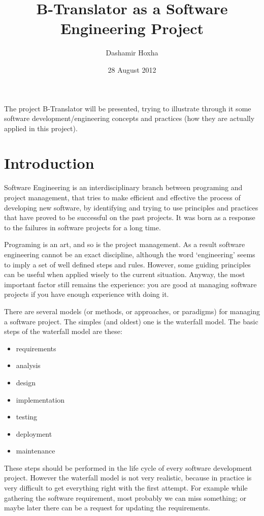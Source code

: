 \documentclass[11pt]{article}
\title{B-Translator as a Software Engineering Project}
\author{Dashamir Hoxha}
\date{28 August 2012}
\begin{document}
\maketitle

\setcounter{tocdepth}{3}
\tableofcontents
\vspace*{1cm}


  The project B-Translator will be presented, trying to illustrate
  through it some software development/engineering concepts and
  practices (how they are actually applied in this project).


\section{Introduction}
\label{sec-1}


  Software Engineering is an interdisciplinary branch between
  programing and project management, that tries to make efficient and
  effective the process of developing new software, by identifying and
  trying to use principles and practices that have proved to be
  successful on the past projects. It was born as a response to the
  failures in software projects for a long time.

  Programing is an art, and so is the project management. As a result
  software engineering cannot be an exact discipline, although the
  word `engineering' seems to imply a set of well defined steps and
  rules. However, some guiding principles can be useful when applied
  wisely to the current situation. Anyway, the most important factor
  still remains the experience: you are good at managing software
  projects if you have enough experience with doing it.

  There are several models (or methods, or approaches, or paradigms)
  for managing a software project. The simples (and oldest) one is the
  waterfall model. The basic steps of the waterfall model are these:
\begin{itemize}
\item requirements
\item analysis
\item design
\item implementation
\item testing
\item deployment
\item maintenance
\end{itemize}
  These steps should be performed in the life cycle of every software
  development project. However the waterfall model is not very
  realistic, because in practice is very difficult to get everything
  right with the first attempt. For example while gathering the
  software requirement, most probably we can miss something; or maybe
  later there can be a request for updating the requirements.
\end{document}
